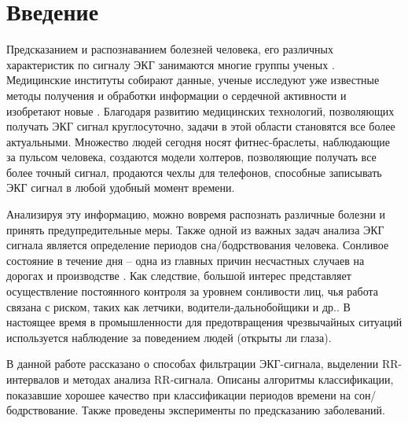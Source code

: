 \chapter{Введение}

Предсказанием и распознаванием болезней человека, его различных характеристик по сигналу ЭКГ занимаются многие группы ученых \cite{about_ekg_sciense1, about_ekg_sciense2}. Медицинские институты собирают данные, ученые исследуют уже известные методы получения и обработки информации о сердечной активности и изобретают новые \cite{get_ekg_signal}. Благодаря развитию медицинских технологий, позволяющих получать ЭКГ сигнал круглосуточно, задачи в этой области становятся все более актуальными. Множество людей сегодня носят фитнес-браслеты, наблюдающие за пульсом человека, создаются модели холтеров, позволяющие получать все более точный сигнал, продаются чехлы для телефонов, способные записывать ЭКГ сигнал в любой удобный момент времени.

Анализируя эту информацию, можно вовремя распознать различные болезни и принять предупредительные меры. Также одной из важных задач анализа ЭКГ сигнала является определение периодов сна/бодрствования человека. Сонливое состояние в течение дня -- одна из главных причин несчастных случаев на дорогах и производстве \cite{accidents}. Как следствие, большой интерес представляет осуществление постоянного контроля за уровнем сонливости лиц, чья работа связана с риском, таких как летчики, водители-дальнобойщики и др.. В настоящее время в промышленности для предотвращения чрезвычайных ситуаций используется наблюдение за поведением людей (открыты ли глаза). 

В данной работе рассказано о способах фильтрации ЭКГ-сигнала, выделении RR-интервалов и методах анализа RR-сигнала. Описаны алгоритмы классификации, показавшие хорошее качество при классификации периодов времени на сон/бодрствование. Также проведены эксперименты по предсказанию заболеваний.